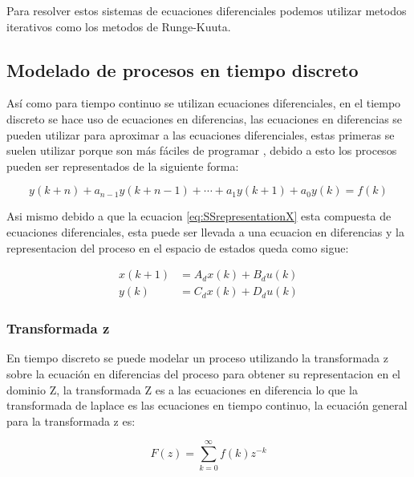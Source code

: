             Para resolver estos sistemas de ecuaciones diferenciales podemos utilizar metodos iterativos como los metodos de Runge-Kuuta.

    \subsection{Modelado de procesos en tiempo discreto}

        Así como para tiempo continuo se utilizan ecuaciones diferenciales, en el tiempo discreto se hace uso de ecuaciones en diferencias, las ecuaciones en diferencias se pueden utilizar para aproximar a las ecuaciones diferenciales, estas primeras se suelen utilizar porque son más fáciles de programar \Parencite{kuo1996sistemas}, debido a esto los procesos pueden ser representados de la siguiente forma:
        
        \begin{equation}\label{eq:EqEnDiferencias}
            y(k+n) + a_{n-1}y(k+n-1) + \cdots + a_1 y(k+1) + a_0 y(k) = f(k) 
        \end{equation}
        
        Asi mismo debido a que la ecuacion \cref{eq:SSrepresentationX} esta compuesta de ecuaciones diferenciales, esta puede ser llevada a una ecuacion en diferencias y la representacion del proceso en el espacio de estados queda como sigue:

        \begin{align}\label{eq:SSdiscreto}
            x(k+1) &= A_d x(k) + B_d u(k) \\
            y(k) &= C_d x(k) + D_d u(k)
        \end{align}

        \subsubsection{Transformada z}
		
			En tiempo discreto se puede modelar un proceso utilizando la transformada z sobre la ecuación en diferencias del proceso para obtener su representacion en el dominio Z, la transformada Z es a las ecuaciones en diferencia lo que la transformada de laplace es las ecuaciones en tiempo continuo, la ecuación general para la transformada z es:
			
			\begin{equation}\label{eq:Ztransform}
				F(z)= \sum\limits_{k=0}^{\infty}f(k)z^{-k}
			\end{equation}

